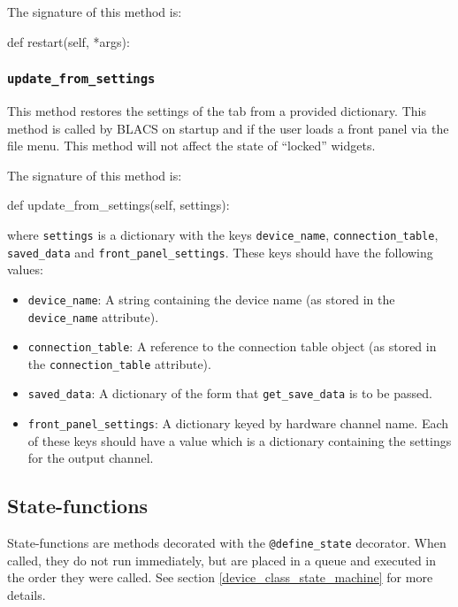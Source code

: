 \documentclass[12pt]{article}
\begin{document}
The signature of this method is:
\begin{python}
def restart(self, *args):
\end{python}


\subsubsection{\texttt{update\_from\_settings}}\label{ref:update_from_settings}
This method restores the settings of the tab from a provided dictionary.
This method is called by BLACS on startup and if the user loads a front panel via the file menu.
This method will not affect the state of ``locked'' widgets.

The signature of this method is:
\begin{python}
def update_from_settings(self, settings):
\end{python}
where \texttt{settings} is a dictionary with the keys \texttt{device\_name}, \texttt{connection\_table}, \texttt{saved\_data} and \texttt{front\_panel\_settings}.
These keys should have the following values:

\begin{itemize}
	\item \texttt{device\_name}: A string containing the device name (as stored in the \texttt{device\_name} attribute).
	\item \texttt{connection\_table}: A reference to the connection table object (as stored in the \texttt{connection\_table} attribute).
	\item \texttt{saved\_data}: A dictionary of the form that \texttt{get\_save\_data} is to be passed.
	\item \texttt{front\_panel\_settings}: A dictionary keyed by hardware channel name. 
	Each of these keys should have a value which is a dictionary containing the settings for the output channel. 
\end{itemize}


%
%
% 
%
\subsection{State-functions}\label{ref:statefunctions}
State-functions are methods decorated with the \texttt{@define\_state} decorator. 
When called, they do not run immediately, but are placed in a queue and executed in the order they were called.
See section \ref{device_class_state_machine} for more details.
\end{document}
